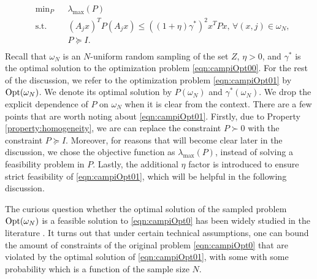\begin{equation}\label{eqn:campiOpt01}
\begin{aligned}
& \text{min}_{P} & & \lambda_{\max}(P) \\
& \text{s.t.} 
&  & (A_j x)^TP(A_j x) \leq {((1 +\eta)\gamma^*)}^2 x^TPx,\,\forall (x, j) \in \omega_N, \\
& && P \succeq I. \\
\end{aligned}
\end{equation}
Recall that $\omega_N$ is an $N$-uniform random sampling of the set $Z$, $\eta > 0$, and $\gamma^*$ is the optimal solution to the optimization problem \eqref{eqn:campiOpt00}. For the rest of the discussion, we refer to the optimization problem \eqref{eqn:campiOpt01} by $ \text{Opt}(\omega_N)$. We denote its optimal solution by $P(\omega_N)$ and $\gamma^*(\omega_N)$. We drop the explicit dependence of $P$ on $\omega_N$ when it is clear from the context. There are a few points that are worth noting about \eqref{eqn:campiOpt01}. Firstly, due to Property \ref{property:homogeneity}, we are can replace the constraint $P \succ 0$ with the constraint $P \succeq I$. Moreover, for reasons that will become clear later in the discussion, we chose the objective function as $\lambda_{\max}(P)$, instead of solving a feasibility problem in $P$. Lastly, the additional $\eta$ factor is introduced to ensure strict feasibility of \eqref{eqn:campiOpt01}, which will be helpful in the following discussion.

The curious question whether the optimal solution of the sampled problem $\text{Opt}(\omega_N)$ is a feasible solution to \eqref{eqn:campiOpt0} has been widely studied in the literature \cite{campi}. It turns out that under certain technical assumptions, one can bound the amount of constraints of the original problem \eqref{eqn:campiOpt0} that are violated by the optimal solution of \eqref{eqn:campiOpt01}, with some with some probability which is a function of the sample size $N$. 

